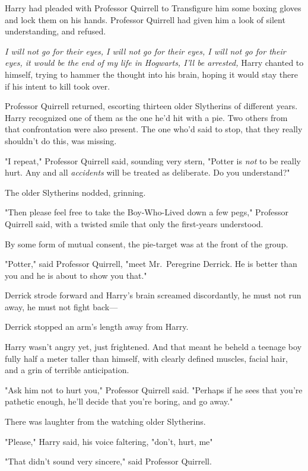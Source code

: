 Harry had pleaded with Professor Quirrell to Transfigure him some boxing gloves
and lock them on his hands. Professor Quirrell had given him a look of silent
understanding, and refused.

\emph{I will not go for their eyes, I will not go for their eyes, I will not go
for their eyes, it would be the end of my life in Hogwarts, I'll be arrested,}
Harry chanted to himself, trying to hammer the thought into his brain, hoping
it would stay there if his intent to kill took over.

Professor Quirrell returned, escorting thirteen older Slytherins of different
years. Harry recognized one of them as the one he'd hit with a pie. Two others
from that confrontation were also present. The one who'd said to stop, that
they really shouldn't do this, was missing.

"I repeat," Professor Quirrell said, sounding very stern, "Potter is \emph{not}
to be really hurt. Any and all \emph{accidents} will be treated as deliberate.
Do you understand?"

The older Slytherins nodded, grinning.

"Then please feel free to take the Boy-Who-Lived down a few pegs," Professor
Quirrell said, with a twisted smile that only the first-years understood.

By some form of mutual consent, the pie-target was at the front of the group.

"Potter," said Professor Quirrell, "meet Mr.~Peregrine Derrick. He is better
than you and he is about to show you that."

Derrick strode forward and Harry's brain screamed discordantly, he must not run
away, he must not fight back---

Derrick stopped an arm's length away from Harry.

Harry wasn't angry yet, just frightened. And that meant he beheld a teenage boy
fully half a meter taller than himself, with clearly defined muscles, facial
hair, and a grin of terrible anticipation.

"Ask him not to hurt you," Professor Quirrell said. "Perhaps if he sees that
you're pathetic enough, he'll decide that you're boring, and go away."

There was laughter from the watching older Slytherins.

"Please," Harry said, his voice faltering, "don't, hurt, me{\el}"

"That didn't sound very sincere," said Professor Quirrell.

